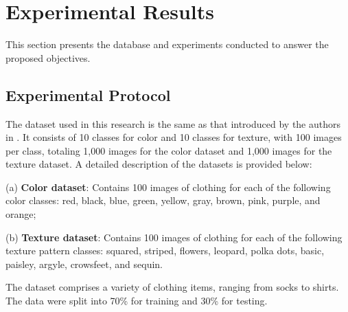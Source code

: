 \documentclass[conference]{IEEEtran}
\begin{document}
\section{Experimental Results}

This section presents the database and experiments conducted to answer the proposed objectives.

\subsection{Experimental Protocol}

The dataset used in this research is the same as that introduced by the authors in \cite{b2}. It consists of 10 classes for color and 10 classes for texture, with 100 images per class, totaling 1,000 images for the color dataset and 1,000 images for the texture dataset. A detailed description of the datasets is provided below:

(a) \textbf{Color dataset}: Contains 100 images of clothing for each of the following color classes: red, black, blue, green, yellow, gray, brown, pink, purple, and orange;

(b) \textbf{Texture dataset}: Contains 100 images of clothing for each of the following texture pattern classes: squared, striped, flowers, leopard, polka dots, basic, paisley, argyle, crowsfeet, and sequin.

The dataset comprises a variety of clothing items, ranging from socks to shirts. The data were split into 70\% for training and 30\% for testing.





\end{document}
